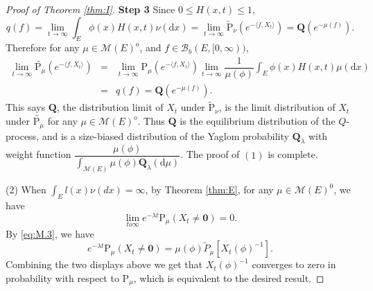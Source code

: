\documentclass[12pt,a4paper]{amsart}
\numberwithin{equation}{section}
\theoremstyle{plain}
\theoremstyle{definition}
\theoremstyle{remark}
\begin{document}
\begin{proof}[Proof of Theorem \ref{thm:I}]
{\bf Step 3}\quad
Since $0\leq H(x,t)\leq 1$,
\begin{equation*}
q(f)
=\lim_{t\rightarrow\infty}\int_E\phi(x)H(x,t)\nu(\mathrm dx)
=\lim_{t\rightarrow\infty}\widetilde{\mathrm P}_{\nu}\left(e^{-\langle f, X_t\rangle }\right)
=\mathbf Q(e^{-\mu(f)}).
\end{equation*}
Therefore for any $\mu\in\mathcal M(E)^o$, and $f\in\mathcal B_b(E,[0,\infty))$,
\begin{eqnarray*}
\lim_{t\rightarrow\infty}\widetilde{\mathrm P_\mu}\left(e^{-\langle f, X_t\rangle}\right)&=&\lim_{t\rightarrow\infty}\mathrm P_\mu\left(e^{-\langle f, X_t\rangle}\right)
\lim_{t\to\infty}\dfrac{1}{\mu(\phi)}\int_E\phi(x)H(x, t)\mu(\mathrm dx)\\
&=&q(f)=\mathbf Q(e^{-\mu(f)}).
\end{eqnarray*}
This says $\mathbf Q$, the distribution limit of $X_t$ under $\widetilde{\mathrm P}_{\nu}$, is the  limit distribution of  $X_t$ under $\widetilde{\mathrm P_\mu}$ for any $\mu\in{\mathcal M(E)}^o$. Thus $\mathbf Q$ is the
equilibrium distribution of the $Q$-process, and is a size-biased distribution of the Yaglom probability $\mathbf Q_\lambda$ with weight function $\dfrac{\mu(\phi)}{\int_{{\mathcal M(E)}}\mu(\phi)\mathbf Q_\lambda(\mathrm d\mu)}$.  The proof of $(1)$ is complete.



(2) When $\int_El(x)\nu(dx)=\infty$,
by Theorem \ref{thm:E}, for any $\mu\in \mathcal M(E)^0$, we have
$$
\lim_{to\infty}e^{-\lambda t}\mathrm P_\mu(X_t\neq\mathbf 0)=0.
$$
By \eqref{eq:M.3}, we have
$$
e^{-\lambda t}\mathrm P_\mu(X_t\neq\mathbf 0)=\mu(\phi)\widetilde{P}_\mu[X_t(\phi)^{-1}].
$$
Combining the two displays above we get that $X_t(\phi)^{-1}$ converges to zero in probability
with respect to $\mathrm P_\mu$, which is equivalent to the desired result.
\end{proof}

\appendix
\section{}
\end{document}
